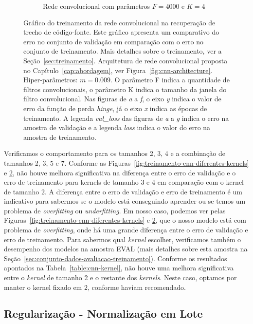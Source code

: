 \begin{figure}[H]
\begin{subfigure}{.5\textwidth}
  \caption{Rede convolucional com parâmetros $F = 4000$ e $K = 4$}
  \label{fig:cnn-4000-k-4}
\end{subfigure}
\caption{Gráfico do treinamento da rede convolucional na recuperação de trecho de código-fonte. Este gráfico apresenta um comparativo do erro no conjunto de validação em comparação com o erro no conjunto de treinamento. Mais detalhes sobre o treinamento, ver a Seção~\ref{sec:treinamento}. Arquitetura de rede convolucional proposta no Capítulo~\ref{cap:abordagem}, ver Figura~\ref{fig:cnn-architecture}. Hiper-parâmetros: $m = 0.009$. O parâmetro F indica a quantidade de filtros convolucionais, o parâmetro K indica o tamanho da janela do filtro convolucional. Nas figuras de \emph{a} a \emph{f}, o eixo \emph{y} indica o valor de erro da função de perda \textit{hinge}, já o eixo \emph{x} indica as épocas de treinamento. A legenda \emph{val\_loss} das figuras de \emph{a} a \emph{g} indica o erro na amostra de validação e a legenda \emph{loss} indica o valor do erro na amostra de treinamento. }
\label{fig:treinamento-cnn-diferentes-kernels-2}
\end{figure}


Verificamos o comportamento para os tamanhos 2, 3, 4 e a combinação de tamanhos 2, 3, 5 e 7. Conforme as Figuras~\ref{fig:treinamento-cnn-diferentes-kernels} e \ref{fig:treinamento-cnn-diferentes-kernels-2}, não houve melhora significativa na diferença entre o erro de validação e o erro de treinamento para kernels de tamanho 3 e 4 em comparação com o kernel de tamanho 2. A diferença entre o erro de validação e erro de treinamento é um indicativo para sabermos se o modelo está conseguindo aprender ou se temos um problema de \textit{overfitting} ou \textit{underfitting}. Em nosso caso, podemos ver pelas Figuras~\ref{fig:treinamento-cnn-diferentes-kernels} e \ref{fig:treinamento-cnn-diferentes-kernels-2}, que o nosso modelo está com problema de \textit{overfitting}, onde há uma grande diferença entre o erro de validação e erro de treinamento. Para sabermos qual \textit{kernel} escolher, verificamos também o desempenho dos modelos na amostra EVAL (mais detalhes sobre esta amostra na Seção~\ref{sec:conjunto-dados-avaliacao-treinamento}). Conforme os resultados apontados na Tabela~\ref{table:cnn-kernel}, não houve uma melhora significativa entre o \textit{kernel} de tamanho 2 e o restante dos \textit{kernels}. Neste caso, optamos por manter o kernel fixado em $2$, conforme \cite{tan-lstm-qa} haviam recomendado.


\subsection{Regularização - Normalização em Lote}
\label{sec:regularizacao-normalizacao-lote}

